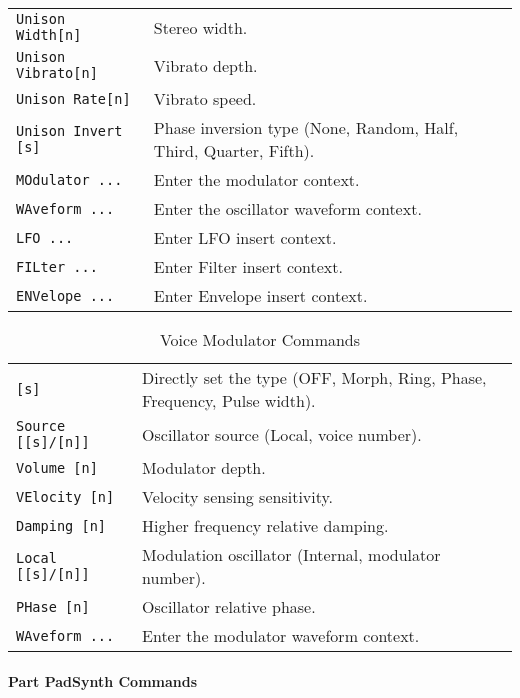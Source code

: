 \begin{table}[H]
\begin{tabular}{l l}
\texttt{Unison Width[n]} &
   Stereo width. \\
\texttt{Unison Vibrato[n]} &
   Vibrato depth. \\
\texttt{Unison Rate[n]} &
   Vibrato speed. \\
\texttt{Unison Invert [s]} &
   Phase inversion type (None, Random, Half, Third, Quarter, Fifth). \\
\texttt{MOdulator ...} &
   Enter the modulator context. \\
\texttt{WAveform ...} &
   Enter the oscillator waveform context. \\
\texttt{LFO ...} &
   Enter LFO insert context.  \\
\texttt{FILter ...} &
   Enter Filter insert context.  \\
\texttt{ENVelope ...} &
   Enter Envelope insert context.   \\
      \end{tabular}
   \end{table}

   \begin{table}[H]
      \caption{Voice Modulator Commands}
      \label{table:yoshimi_part_addsynth_voice_modulator_commands}
      \begin{tabular}{l l}

\texttt{[s]} &
   Directly set the type (OFF, Morph, Ring, Phase, Frequency, Pulse width). \\
\texttt{Source [[s]/[n]]} &
   Oscillator source (Local, voice number). \\
\texttt{Volume [n]} &
   Modulator depth.  \\
\texttt{VElocity [n]} &
   Velocity sensing sensitivity. \\
\texttt{Damping [n]} &
   Higher frequency relative damping. \\
\texttt{Local [[s]/[n]]} &
   Modulation oscillator (Internal, modulator number). \\
\texttt{PHase [n]} &
   Oscillator relative phase. \\
\texttt{WAveform ...} &
   Enter the modulator waveform context. \\
      \end{tabular}
   \end{table}

\paragraph{Part PadSynth Commands}
\label{paragraph:command_line_part_padsynth_commands}

